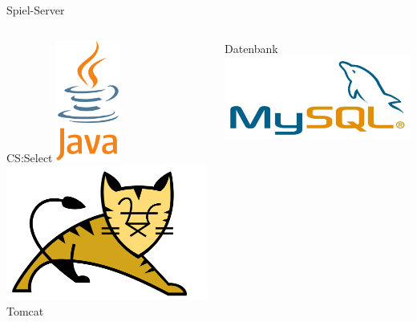 \documentclass[xcolor=dvipsnames]{beamer}
\begin{document}
\begin{frame}{Spiel-Server}
\begin{columns}
\begin{column}{0.5\textwidth}
         \begin{block}{CS:Select}
                \center
                \includegraphics[height=4cm]{img/java.png}\\
                \includegraphics[width=(\textwidth) / 2]{img/tomcat.png}
                Tomcat
            \end{block} 
\end{column}
\begin{column}{0.5\textwidth}  %
        \begin{block}{Datenbank}
                \includegraphics[width=\textwidth]{img/MySQL.jpg}
    \end{block}
\end{column}
\end{columns}
\end{frame}
\end{document}
